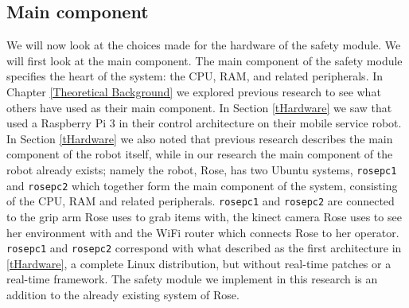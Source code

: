 \documentclass[12pt]{scrreprt}
\begin{document}
\subsection{Main component}
\label{Main component}
We will now look at the choices made for the hardware of the safety module. We will first look at the main component. The main component of the safety module specifies the heart of the system: the CPU, RAM, and related peripherals. In Chapter \ref{Theoretical Background} we explored previous research to see what others have used as their main component. In Section \ref{tHardware} we saw that \citeauthor{delgado} used a Raspberry Pi 3 in their control architecture on their mobile service robot. In Section  \ref{tHardware} we also noted that previous research describes the main component of the robot itself, while in our research the main component of the robot already exists; namely the robot, Rose, has two Ubuntu systems, \texttt{rosepc1} and \texttt{rosepc2} which together form the main component of the system, consisting of the CPU, RAM and related peripherals. \texttt{rosepc1} and \texttt{rosepc2} are connected to the grip arm Rose uses to grab items with, the kinect camera Rose uses to see her environment with and the WiFi router which connects Rose to her operator. \texttt{rosepc1} and \texttt{rosepc2} correspond with what \citeauthor{bouchier} described as the first architecture in \ref{tHardware}, a complete Linux distribution, but without real-time patches or a real-time framework. The safety module we implement in this research is an addition to the already existing system of Rose.\\
\end{document}
